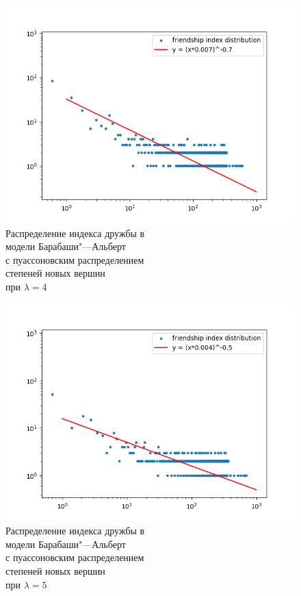 \documentclass[bachelor, och, diploma]{SCWorks}
\begin{document}
\begin{figure}[!ht]
    \centering
    \includegraphics[scale=0.5]{diploma_results/static_log/bap_dist_beta_4.png}
    \caption{Распределение индекса дружбы  в\\ модели Барабаши"---Альберт\\ с пуассоновским распределением\\ степеней новых вершин \\ при $\lambda=4$}
\end{figure}
\begin{figure}[!ht]
    \centering
    \includegraphics[scale=0.5]{diploma_results/static_log/bap_dist_beta_5.png}
        \caption{Распределение индекса дружбы  в\\ модели Барабаши"---Альберт\\ с пуассоновским распределением\\ степеней новых вершин \\ при $\lambda=5$}
\end{figure}
\end{document}
